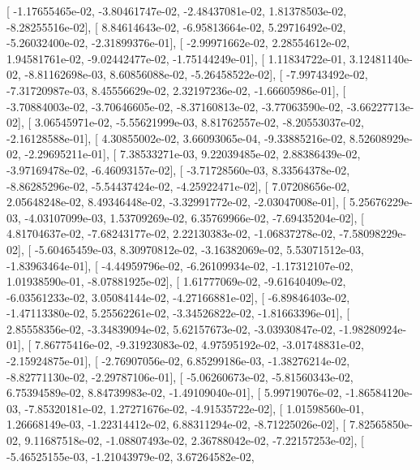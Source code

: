 \documentclass{article}
\begin{document}
       [ -1.17655465e-02,  -3.80461747e-02,  -2.48437081e-02,
          1.81378503e-02,  -8.28255516e-02],
       [  8.84614643e-02,  -6.95813664e-02,   5.29716492e-02,
         -5.26032400e-02,  -2.31899376e-01],
       [ -2.99971662e-02,   2.28554612e-02,   1.94581761e-02,
         -9.02442477e-02,  -1.75144249e-01],
       [  1.11834722e-01,   3.12481140e-02,  -8.81162698e-03,
          8.60856088e-02,  -5.26458522e-02],
       [ -7.99743492e-02,  -7.31720987e-03,   8.45556629e-02,
          2.32197236e-02,  -1.66605986e-01],
       [ -3.70884003e-02,  -3.70646605e-02,  -8.37160813e-02,
         -3.77063590e-02,  -3.66227713e-02],
       [  3.06545971e-02,  -5.55621999e-03,   8.81762557e-02,
         -8.20553037e-02,  -2.16128588e-01],
       [  4.30855002e-02,   3.66093065e-04,  -9.33885216e-02,
          8.52608929e-02,  -2.29695211e-01],
       [  7.38533271e-03,   9.22039485e-02,   2.88386439e-02,
         -3.97169478e-02,  -6.46093157e-02],
       [ -3.71728560e-03,   8.33564378e-02,  -8.86285296e-02,
         -5.54437424e-02,  -4.25922471e-02],
       [  7.07208656e-02,   2.05648248e-02,   8.49346448e-02,
         -3.32991772e-02,  -2.03047008e-01],
       [  5.25676229e-03,  -4.03107099e-03,   1.53709269e-02,
          6.35769966e-02,  -7.69435204e-02],
       [  4.81704637e-02,  -7.68243177e-02,   2.22130383e-02,
         -1.06837278e-02,  -7.58098229e-02],
       [ -5.60465459e-03,   8.30970812e-02,  -3.16382069e-02,
          5.53071512e-03,  -1.83963464e-01],
       [ -4.44959796e-02,  -6.26109934e-02,  -1.17312107e-02,
          1.01938590e-01,  -8.07881925e-02],
       [  1.61777069e-02,  -9.61640409e-02,  -6.03561233e-02,
          3.05084144e-02,  -4.27166881e-02],
       [ -6.89846403e-02,  -1.47113380e-02,   5.25562261e-02,
         -3.34526822e-02,  -1.81663396e-01],
       [  2.85558356e-02,  -3.34839094e-02,   5.62157673e-02,
         -3.03930847e-02,  -1.98280924e-01],
       [  7.86775416e-02,  -9.31923083e-02,   4.97595192e-02,
         -3.01748831e-02,  -2.15924875e-01],
       [ -2.76907056e-02,   6.85299186e-03,  -1.38276214e-02,
         -8.82771130e-02,  -2.29787106e-01],
       [ -5.06260673e-02,  -5.81560343e-02,   6.75394589e-02,
          8.84739983e-02,  -1.49109040e-01],
       [  5.99719076e-02,  -1.86584120e-03,  -7.85320181e-02,
          1.27271676e-02,  -4.91535722e-02],
       [  1.01598560e-01,   1.26668149e-03,  -1.22314412e-02,
          6.88311294e-02,  -8.71225026e-02],
       [  7.82565850e-02,   9.11687518e-02,  -1.08807493e-02,
          2.36788042e-02,  -7.22157253e-02],
       [ -5.46525155e-03,  -1.21043979e-02,   3.67264582e-02,
\end{document}
